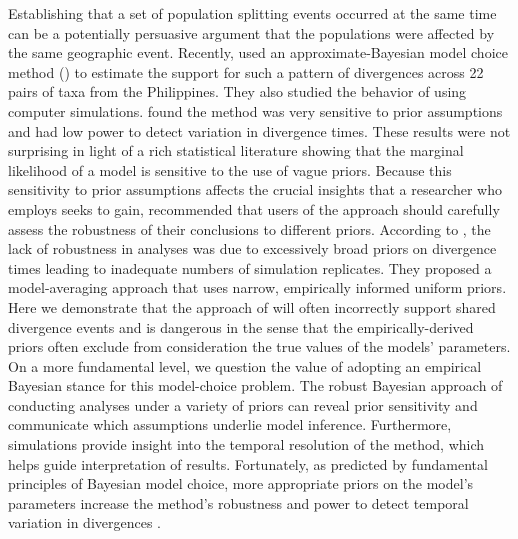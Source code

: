 Establishing that a set of population splitting events occurred at the same
time can be a potentially persuasive argument that the populations were
affected by the same geographic event.
Recently, \citet{Oaks2012} used an approximate-Bayesian model choice method
(\msb) to estimate the support for such a pattern of divergences across 22
pairs of taxa from the Philippines.
They also studied the behavior of \msb using computer simulations.
\citet{Oaks2012} found the method was very sensitive to prior assumptions and
had low power to detect variation in divergence times.
These results were not surprising in light of a rich statistical literature
showing that the marginal likelihood of a model is sensitive to the
use of vague priors.
Because this sensitivity to prior assumptions affects the crucial insights 
that a researcher who employs \msb seeks to gain, \citet{Oaks2012} recommended
that users of the approach should carefully assess the robustness of their 
conclusions to different priors.
According to \citet{Hickerson2013}, the lack of robustness in \msb analyses
was due to excessively broad priors on divergence times leading to 
inadequate numbers of simulation replicates.
They proposed a model-averaging approach that uses narrow, empirically
informed uniform priors.
Here we demonstrate that the approach of \citet{Hickerson2013} will often
incorrectly support shared divergence events and is dangerous in the sense that
the empirically-derived priors often exclude from consideration the true values
of the models' parameters.
On a more fundamental level, we question the value of adopting an empirical
Bayesian stance for this model-choice problem.
The robust Bayesian approach of conducting analyses under a variety of priors
can reveal prior sensitivity and communicate which assumptions underlie model
inference.
Furthermore, simulations provide insight into the temporal resolution of the
method, which helps guide interpretation of results.
Fortunately, as predicted by fundamental principles of Bayesian model choice,
more appropriate priors on the model's parameters increase the method's
robustness and power to detect temporal variation in divergences
\citep{Oaks2014dpp}.
